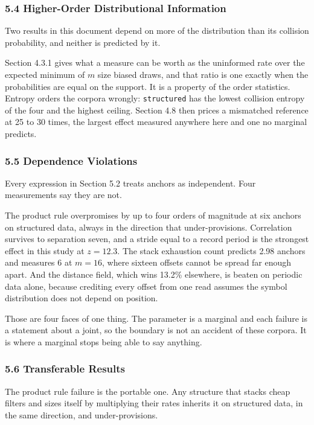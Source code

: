 \subsubsection{5.4 Higher-Order Distributional Information}

Two results in this document depend on more of the distribution than its collision probability, and neither is predicted by it.

Section 4.3.1 gives what a measure can be worth as the uninformed rate over the expected minimum of \(m\) size biased draws, and that ratio is one exactly when the probabilities are equal on the support. It is a property of the order statistics. Entropy orders the corpora wrongly: \texttt{structured} has the lowest collision entropy of the four and the highest ceiling. Section 4.8 then prices a mismatched reference at 25 to 30 times, the largest effect measured anywhere here and one no marginal predicts.

\subsubsection{5.5 Dependence Violations}

Every expression in Section 5.2 treats anchors as independent. Four measurements say they are not.

The product rule overpromises by up to four orders of magnitude at six anchors on structured data, always in the direction that under-provisions. Correlation survives to separation seven, and a stride equal to a record period is the strongest effect in this study at \(z = 12.3\). The stack exhaustion count predicts 2.98 anchors and measures 6 at \(m = 16\), where sixteen offsets cannot be spread far enough apart. And the distance field, which wins 13.2\% elsewhere, is beaten on periodic data alone, because crediting every offset from one read assumes the symbol distribution does not depend on position.

Those are four faces of one thing. The parameter is a marginal and each failure is a statement about a joint, so the boundary is not an accident of these corpora. It is where a marginal stops being able to say anything.

\subsubsection{5.6 Transferable Results}

The product rule failure is the portable one. Any structure that stacks cheap filters and sizes itself by multiplying their rates inherits it on structured data, in the same direction, and under-provisions.

